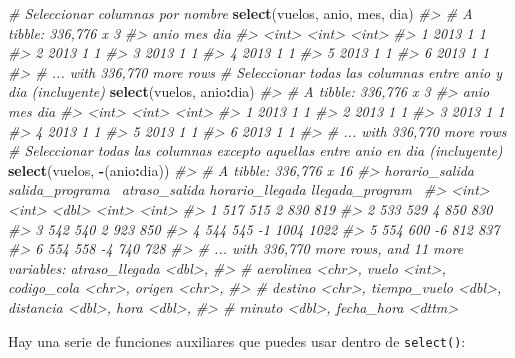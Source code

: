 \documentclass[11pt,oneside]{report}
\newenvironment{Shaded}{\begin{snugshade}}{\end{snugshade}}
\newcommand{\CommentTok}[1]{\textcolor[rgb]{0.56,0.35,0.01}{\textit{#1}}}
\newcommand{\KeywordTok}[1]{\textcolor[rgb]{0.13,0.29,0.53}{\textbf{#1}}}
\newcommand{\NormalTok}[1]{#1}
\newcommand{\OperatorTok}[1]{\textcolor[rgb]{0.81,0.36,0.00}{\textbf{#1}}}
\begin{document}
\begin{Shaded}
\begin{Highlighting}[]
\CommentTok{# Seleccionar columnas por nombre}
\KeywordTok{select}\NormalTok{(vuelos, anio, mes, dia)}
\CommentTok{#> # A tibble: 336,776 x 3}
\CommentTok{#>    anio   mes   dia}
\CommentTok{#>   <int> <int> <int>}
\CommentTok{#> 1  2013     1     1}
\CommentTok{#> 2  2013     1     1}
\CommentTok{#> 3  2013     1     1}
\CommentTok{#> 4  2013     1     1}
\CommentTok{#> 5  2013     1     1}
\CommentTok{#> 6  2013     1     1}
\CommentTok{#> # ... with 336,770 more rows}
\CommentTok{# Seleccionar todas las columnas entre anio y dia (incluyente)}
\KeywordTok{select}\NormalTok{(vuelos, anio}\OperatorTok{:}\NormalTok{dia)}
\CommentTok{#> # A tibble: 336,776 x 3}
\CommentTok{#>    anio   mes   dia}
\CommentTok{#>   <int> <int> <int>}
\CommentTok{#> 1  2013     1     1}
\CommentTok{#> 2  2013     1     1}
\CommentTok{#> 3  2013     1     1}
\CommentTok{#> 4  2013     1     1}
\CommentTok{#> 5  2013     1     1}
\CommentTok{#> 6  2013     1     1}
\CommentTok{#> # ... with 336,770 more rows}
\CommentTok{# Seleccionar todas las columnas excepto aquellas entre anio en dia (incluyente)}
\KeywordTok{select}\NormalTok{(vuelos, }\OperatorTok{-}\NormalTok{(anio}\OperatorTok{:}\NormalTok{dia))}
\CommentTok{#> # A tibble: 336,776 x 16}
\CommentTok{#>   horario_salida salida_programa~ atraso_salida horario_llegada llegada_program~}
\CommentTok{#>            <int>            <int>         <dbl>           <int>            <int>}
\CommentTok{#> 1            517              515             2             830              819}
\CommentTok{#> 2            533              529             4             850              830}
\CommentTok{#> 3            542              540             2             923              850}
\CommentTok{#> 4            544              545            -1            1004             1022}
\CommentTok{#> 5            554              600            -6             812              837}
\CommentTok{#> 6            554              558            -4             740              728}
\CommentTok{#> # ... with 336,770 more rows, and 11 more variables: atraso_llegada <dbl>,}
\CommentTok{#> #   aerolinea <chr>, vuelo <int>, codigo_cola <chr>, origen <chr>,}
\CommentTok{#> #   destino <chr>, tiempo_vuelo <dbl>, distancia <dbl>, hora <dbl>,}
\CommentTok{#> #   minuto <dbl>, fecha_hora <dttm>}
\end{Highlighting}
\end{Shaded}

Hay una serie de funciones auxiliares que puedes usar dentro de
\texttt{select()}:
\end{document}

